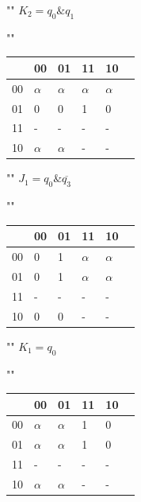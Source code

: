\documentclass[a4paper,12pt]{article}
\begin{document}
\begin{center}
	""\newline\newline
	$K_{2} = q_{0} \& q_{1}$
	
	""\newline
	\begin{tabular}{ | l | l | l | l | l | p{1cm} |}
		\hline
		\diagbox[width=5em]{$q_{3}q_{2}$}{$q_{1}q_{0}$} & 00 & 01 & 11 & 10 \\\hline
		00 & $\alpha$ & $\alpha$  & \cellcolor{blue!25} $\alpha$ & $\alpha$  \\\hline
		01 & 0 & 0  & \cellcolor{blue!25} 1 & 0  \\\hline
		11 & - & -  & \cellcolor{blue!25} - & -  \\\hline
		10 & $\alpha$ & $\alpha$ & \cellcolor{blue!25} - & -  \\
		\hline
	\end{tabular}

	""\newline\newline
	$J_{1} = q_{0} \& \overline{q_{3}}$
	
	""\newline
	\begin{tabular}{ | l | l | l | l | l | p{1cm} |}
		\hline
		\diagbox[width=5em]{$q_{3}q_{2}$}{$q_{1}q_{0}$} & 00 & 01 & 11 & 10 \\\hline
		00 & 0 & \cellcolor{blue!25} 1  & \cellcolor{blue!25} $\alpha$ & $\alpha$  \\\hline
		01 & 0 & \cellcolor{blue!25} 1  & \cellcolor{blue!25} $\alpha$ & $\alpha$  \\\hline
		11 & - & -  & - & -  \\\hline
		10 & 0 & 0  & - & -  \\
		\hline
	\end{tabular}

	""\newline\newline
	$K_{1} = q_{0}$
	
	""\newline
	\begin{tabular}{ | l | l | l | l | l | p{1cm} |}
		\hline
		\diagbox[width=5em]{$q_{3}q_{2}$}{$q_{1}q_{0}$} & 00 & 01 & 11 & 10 \\\hline
		00 & $\alpha$ & \cellcolor{blue!25} $\alpha$  & \cellcolor{blue!25} 1 & 0  \\\hline
		01 & $\alpha$ & \cellcolor{blue!25} $\alpha$  & \cellcolor{blue!25} 1 & 0  \\\hline
		11 & - & \cellcolor{blue!25} -  & \cellcolor{blue!25} - & -  \\\hline
		10 & $\alpha$ & \cellcolor{blue!25} $\alpha$ & \cellcolor{blue!25} - & -  \\
		\hline
	\end{tabular}


\end{center}
\end{document}
